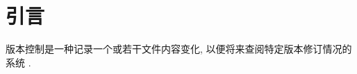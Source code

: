 \documentclass[../main.tex]{subfiles}
\begin{document}
\section{引言}

版本控制是一种记录一个或若干文件内容变化, 以便将来查阅特定版本修订情况的系统
\cite{progit}.
\end{document}
